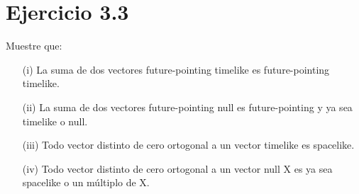 \documentclass[a4paper, 11pt]{article}
\begin{document}
\section*{Ejercicio 3.3}
Muestre que:
\begin{enumerate}
    \item[(i)] La suma de dos vectores future-pointing timelike es future-pointing timelike.
    \item[(ii)] La suma de dos vectores future-pointing null es future-pointing y ya sea timelike o null.
    \item[(iii)] Todo vector distinto de cero ortogonal a un vector timelike es spacelike. 
    \item[(iv)] Todo vector distinto de cero ortogonal a un vector null X es ya sea spacelike o un múltiplo de X.  
\end{enumerate}
\end{document}

